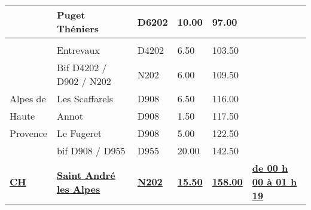 \documentclass{article}%
\begin{document}
\begin{longtable}{p{2.25cm}|p{6.7cm}|p{2.0cm}|p{1.5cm}|p{1.5cm}|p{3.5cm}}
 &Puget Théniers&D6202&10.00&97.00& \\%
\hline& & & & & \\%
 &Entrevaux&D4202&6.50&103.50& \\%
 &Bif D4202 / D902 / N202&N202&6.00&109.50& \\%
Alpes de&Les Scaffarels&D908&6.50&116.00& \\%
Haute&Annot&D908&1.50&117.50& \\%
Provence&Le Fugeret&D908&5.00&122.50& \\%
 &bif D908 / D955&D955&20.00&142.50& \\%
\textbf{\underline{CH}}&\textbf{\underline{Saint André les Alpes}}&\textbf{\underline{N202}}&\textbf{\underline{15.50}}&\textbf{\underline{158.00}}&\textbf{\underline{de 00 h 00 à 01 h 19}}\\%
\hline%
\end{longtable}%
\end{document}
